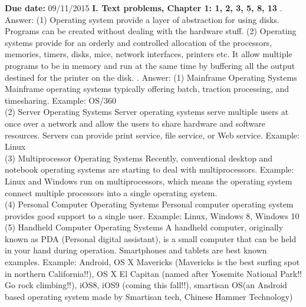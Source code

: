 \documentclass[12pt]{article}
\begin{document}
\textbf{Due date:}{ 09/11/2015}\hfill \break
\newline
\textbf{I. Text problems, Chapter 1: 1, 2, 3, 5, 8, 13}\hfill \break
{}. Answer:\newline
(1) Operating system provide a layer of abstraction for using disks. Programs can be created without dealing with the hardware stuff. \hfill \break
(2) Operating systems provide for an orderly and controlled allocation of the processors, memories, timers, disks, mice, network interfaces, printers etc. It allow multiple programs to be in memory and run at the same time by buffering all the output destined for the printer on the disk.  \hfill  \break
{}. Answer:\newline
(1) Mainframe Operating Systems\hfill  \break
Mainframe operating systems typically offering batch, traction processing, and timesharing. \hfill  \break
Example: OS/360\hfill \break \\
(2) Server Operating Systems\hfill  \break
Server operating systems serve multiple users at once over a network and allow the users to share hardware and software resources. Servers can provide print service, file service, or Web service. \hfill  \break 
Example: Linux\hfill  \break \\
(3) Multiprocessor Operating Systems\hfill  \break
Recently, conventional desktop and notebook operating systems are starting to deal with multiprocessors.\hfill  \break
Example: Linux and Windows run on multiprocessors, which means the operating system connect multiple processors into a single operating system. \hfill  \break \\
(4) Personal Computer Operating Systems\hfill  \break
Personal computer operating system provides good support to a single user.\hfill  \break
Example: Linux, Windows 8, Windows 10\hfill  \break \\
(5) Handheld Computer Operating Systems \hfill  \break
A handheld computer, originally known as PDA (Personal digital assistant), is a small computer that can be held in your hand during operation. Smartphones and tablets are best known examples. \hfill  \break 
Example: Android, OS X Mavericks {\scriptsize(Mavericks is the best surfing spot in northern California!!)}, OS X El Capitan {\scriptsize(named after Yosemite National Park!! Go rock climbing!!)},  iOS8, iOS9 {\scriptsize(coming this fall!!)}, smartisan OS{\scriptsize(an Android based operating system made by Smartisan tech, Chinese Hammer Technology)}\hfill \break \\
\end{document}
